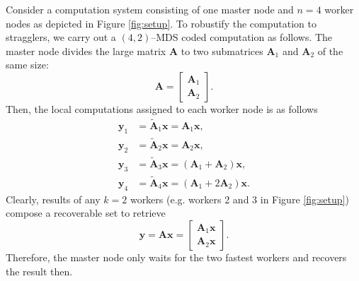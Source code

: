 \documentclass[onecolumn,journal,twoside]{IEEEtran}
\begin{document}
\begin{example}
Consider a computation system consisting of one master node and $n=4$ worker nodes as depicted in Figure \ref{fig:setup}. To robustify the computation to stragglers, we carry out a $(4,2)$--MDS coded computation as follows. The master node divides the large matrix $\mathbf{A}$ to two submatrices $\mathbf{A}_1$ and $\mathbf{A}_2$ of the same size:
\begin{equation}
    \mathbf{A}=
    \begin{bmatrix}
    \mathbf{A}_1   \\
    \mathbf{A}_2
\end{bmatrix}.
\end{equation}
Then, the local computations assigned to each worker node is as follows
\begin{align}
\mathbf{y}_1 &=\widetilde{\mathbf{A}}_1\mathbf{x}=\mathbf{A}_1\mathbf{x},\nonumber\\
\mathbf{y}_2 &=\widetilde{\mathbf{A}}_2\mathbf{x}=\mathbf{A}_2\mathbf{x},\nonumber\\
\mathbf{y}_3 &=\widetilde{\mathbf{A}}_3\mathbf{x}=(\mathbf{A}_1+\mathbf{A}_2)\mathbf{x},\nonumber\\
\mathbf{y}_4 &=\widetilde{\mathbf{A}}_4\mathbf{x}=(\mathbf{A}_1+2\mathbf{A}_2)\mathbf{x}.
\end{align}
Clearly, results of any $k=2$ workers (e.g. workers 2 and 3 in Figure \ref{fig:setup}) compose a recoverable set to retrieve 
\begin{equation}
    \mathbf{y}=\mathbf{A}\mathbf{x}=
    \begin{bmatrix}
    \mathbf{A}_1 \mathbf{x}  \\
    \mathbf{A}_2\mathbf{x}
\end{bmatrix}.
\end{equation}
Therefore, the master node only waits for the two fastest workers and recovers the result then.
\end{example}
\end{document}
